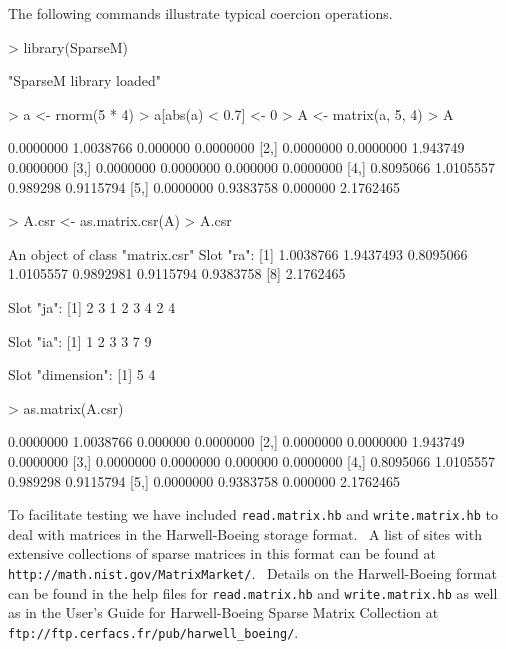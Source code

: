 \documentclass{article}
\begin{document}
The following commands illustrate typical coercion operations.

\begin{Schunk}
\begin{Sinput}
> library(SparseM)
\end{Sinput}
\begin{Soutput}
[1] "SparseM library loaded"
\end{Soutput}
\begin{Sinput}
> a <- rnorm(5 * 4)
> a[abs(a) < 0.7] <- 0
> A <- matrix(a, 5, 4)
> A
\end{Sinput}
\begin{Soutput}
          [,1]      [,2]     [,3]      [,4]
[1,] 0.0000000 1.0038766 0.000000 0.0000000
[2,] 0.0000000 0.0000000 1.943749 0.0000000
[3,] 0.0000000 0.0000000 0.000000 0.0000000
[4,] 0.8095066 1.0105557 0.989298 0.9115794
[5,] 0.0000000 0.9383758 0.000000 2.1762465
\end{Soutput}
\begin{Sinput}
> A.csr <- as.matrix.csr(A)
> A.csr
\end{Sinput}
\begin{Soutput}
An object of class "matrix.csr"
Slot "ra":
[1] 1.0038766 1.9437493 0.8095066 1.0105557 0.9892981 0.9115794 0.9383758
[8] 2.1762465

Slot "ja":
[1] 2 3 1 2 3 4 2 4

Slot "ia":
[1] 1 2 3 3 7 9

Slot "dimension":
[1] 5 4
\end{Soutput}
\begin{Sinput}
> as.matrix(A.csr)
\end{Sinput}
\begin{Soutput}
          [,1]      [,2]     [,3]      [,4]
[1,] 0.0000000 1.0038766 0.000000 0.0000000
[2,] 0.0000000 0.0000000 1.943749 0.0000000
[3,] 0.0000000 0.0000000 0.000000 0.0000000
[4,] 0.8095066 1.0105557 0.989298 0.9115794
[5,] 0.0000000 0.9383758 0.000000 2.1762465
\end{Soutput}
\end{Schunk}
To facilitate testing we have included \texttt{read.matrix.hb} 
and \texttt{write.matrix.hb} to deal with matrices
in the Harwell-Boeing storage format.  \ A list of sites with
extensive collections of sparse matrices  in this format can be found at
\texttt{http://math.nist.gov/MatrixMarket/}. \ Details on the Harwell-Boeing format can
be found in the help files for \texttt{read.matrix.hb} and \texttt{write.matrix.hb} as well
as in the User's Guide for Harwell-Boeing Sparse Matrix Collection at
\texttt{ftp://ftp.cerfacs.fr/pub/harwell\_boeing/}.
\end{document}
